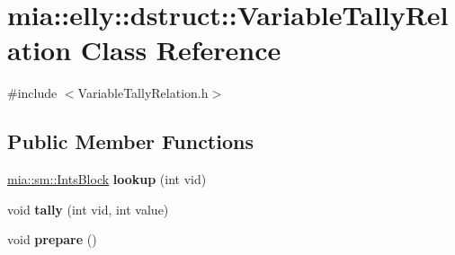 \hypertarget{classmia_1_1elly_1_1dstruct_1_1_variable_tally_relation}{\section{mia\-:\-:elly\-:\-:dstruct\-:\-:Variable\-Tally\-Relation Class Reference}
\label{classmia_1_1elly_1_1dstruct_1_1_variable_tally_relation}
}


{\ttfamily \#include $<$Variable\-Tally\-Relation.\-h$>$}

\subsection*{Public Member Functions}
\begin{DoxyCompactItemize}
\item 
\hypertarget{classmia_1_1elly_1_1dstruct_1_1_variable_tally_relation_a9d181c38b6f5b0a00f9ae033ea9ca14b}{\hyperlink{classmia_1_1sm_1_1_ints_block}{mia\-::sm\-::\-Ints\-Block} {\bfseries lookup} (int vid)}\label{classmia_1_1elly_1_1dstruct_1_1_variable_tally_relation_a9d181c38b6f5b0a00f9ae033ea9ca14b}

\item 
\hypertarget{classmia_1_1elly_1_1dstruct_1_1_variable_tally_relation_a43fe583de7fae37ec40ba1f86a5a0a0c}{void {\bfseries tally} (int vid, int value)}\label{classmia_1_1elly_1_1dstruct_1_1_variable_tally_relation_a43fe583de7fae37ec40ba1f86a5a0a0c}

\item 
\hypertarget{classmia_1_1elly_1_1dstruct_1_1_variable_tally_relation_a9619f574476f63f659c93e4585a9df1f}{void {\bfseries prepare} ()}\label{classmia_1_1elly_1_1dstruct_1_1_variable_tally_relation_a9619f574476f63f659c93e4585a9df1f}

\end{DoxyCompactItemize}
